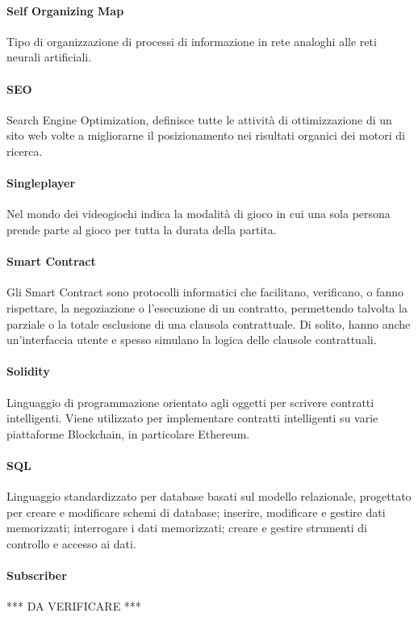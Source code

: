 \documentclass[]{article}
\begin{document}
	\paragraph*{Self Organizing Map}
	Tipo di organizzazione di processi di informazione in rete analoghi alle reti neurali artificiali.
	
	\paragraph*{SEO}
	Search Engine Optimization, definisce tutte le attività di ottimizzazione di un sito web volte a migliorarne il posizionamento nei risultati organici dei motori di ricerca.
	
	\paragraph*{Singleplayer}
	Nel mondo dei videogiochi indica la modalità di gioco in cui una sola persona prende parte al gioco per tutta la durata della partita.
	
	\paragraph*{Smart Contract}
	Gli Smart Contract sono protocolli informatici che facilitano, verificano, o fanno rispettare, la negoziazione o l'esecuzione di un contratto, permettendo talvolta la parziale o la totale esclusione di una clausola contrattuale. Di solito, hanno anche un'interfaccia utente e spesso simulano la logica delle clausole contrattuali.
	
	\paragraph*{Solidity}
	Linguaggio di programmazione orientato agli oggetti per scrivere contratti intelligenti. Viene utilizzato per implementare contratti intelligenti su varie piattaforme Blockchain, in particolare Ethereum.
	
	\paragraph*{SQL}
	Linguaggio standardizzato per database basati sul modello relazionale, progettato per creare e modificare schemi di database; inserire, modificare e gestire dati memorizzati; interrogare i dati memorizzati; creare e gestire strumenti di controllo e accesso ai dati.
	
	\paragraph*{Subscriber}
	*** DA VERIFICARE ***
	
\end{document}
